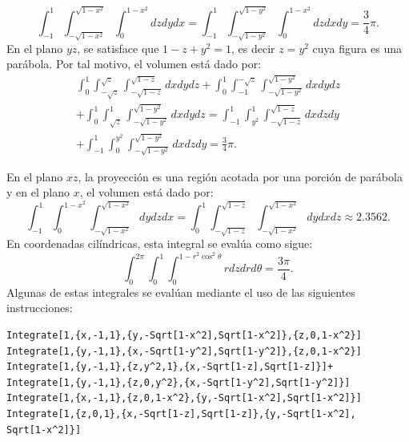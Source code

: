 \[\int_{-1}^{1}\int_{-\sqrt{1-x^2}}^{\sqrt{1-x^2}}\int_{0}^{1-x^2}dzdydx= \int_{-1}^{1}\int_{-\sqrt{1-y^2}}^{\sqrt{1-y^2}}\int_{0}^{1-x^2}dzdxdy= \frac{3}{4}\pi.\]
%
En el plano $yz$, se satisface que $1-z+y^2=1$, es decir $z=y^2$ cuya figura es una parábola. Por tal motivo, el volumen está dado por:
\begin{multline*}
\int_{0}^{1}\int_{-\sqrt{z}}^{\sqrt{z}}\int_{-\sqrt{1-z}}^{\sqrt{1-z}}dxdydz +\int_{0}^{1}\int_{-1}^{-\sqrt{z}}\int_{-\sqrt{1-y^2}}^{\sqrt{1-y^2}}dxdydz \\ +\int_{0}^{1}\int_{\sqrt{z}}^{1}\int_{-\sqrt{1-y^2}}^{\sqrt{1-y^2}}dxdydz
=\int_{-1}^1\int_{y^2}^1\int_{-\sqrt{1-z}}^{\sqrt{1-z}}dxdzdy \\ +\int_{-1}^{1}\int_0^{y^2}\int_{-\sqrt{1-y^2}}^{\sqrt{1-y^2}}dxdzdy=\frac{3}{4}\pi.
\end{multline*}

En el plano $xz$, la proyección es una región acotada por una porción de parábola y en el plano $x$, el volumen está dado por:
\[\int_{-1}^{1}\int_{0}^{1-x^2}\int_{-\sqrt{1-x^2}}^{\sqrt{1-x^2}}dydzdx = \int_{0}^{1}\int_{-\sqrt{1-z}}^{\sqrt{1-z}}\int_{-\sqrt{1-x^2}}^{\sqrt{1-x^2}}dydxdz \approx 2.3562.\]
En coordenadas cilíndricas, esta integral se evalúa como sigue:
\[\int_0^{2\pi} \int_0^1 \int_0^{1-r^2\cos^2 \theta} r dzdrd \theta =\frac{3\pi}{4}.\]
Algunas de estas integrales se evalúan mediante el uso de las siguientes instrucciones:

\begin{tcolorbox}[title=\bf Instrucción en \verb"Mathematica"]
\begin{Verbatim}[formatcom=\letraverbatim]
Integrate[1,{x,-1,1},{y,-Sqrt[1-x^2],Sqrt[1-x^2]},{z,0,1-x^2}]
Integrate[1,{y,-1,1},{x,-Sqrt[1-y^2],Sqrt[1-y^2]},{z,0,1-x^2}]
Integrate[1,{y,-1,1},{z,y^2,1},{x,-Sqrt[1-z],Sqrt[1-z]}]+
Integrate[1,{y,-1,1},{z,0,y^2},{x,-Sqrt[1-y^2],Sqrt[1-y^2]}]
Integrate[1,{x,-1,1},{z,0,1-x^2},{y,-Sqrt[1-x^2],Sqrt[1-x^2]}]
Integrate[1,{z,0,1},{x,-Sqrt[1-z],Sqrt[1-z]},{y,-Sqrt[1-x^2],
Sqrt[1-x^2]}]
\end{Verbatim}
\end{tcolorbox}

